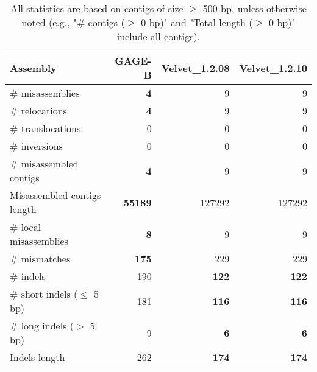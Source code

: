 \documentclass[12pt,a4paper]{article}
\begin{document}
\begin{table}[ht]
\begin{center}
\caption{All statistics are based on contigs of size $\geq$ 500 bp, unless otherwise noted (e.g., "\# contigs ($\geq$ 0 bp)" and "Total length ($\geq$ 0 bp)" include all contigs).}
\begin{tabular}{|l*{3}{|r}|}
\hline
Assembly & GAGE-B & Velvet\_1.2.08 & Velvet\_1.2.10 \\ \hline
\# misassemblies & {\bf 4} & 9 & 9 \\ \hline
\hspace{5mm}\# relocations & {\bf 4} & 9 & 9 \\ \hline
\hspace{5mm}\# translocations & 0 & 0 & 0 \\ \hline
\hspace{5mm}\# inversions & 0 & 0 & 0 \\ \hline
\# misassembled contigs & {\bf 4} & 9 & 9 \\ \hline
Misassembled contigs length & {\bf 55189} & 127292 & 127292 \\ \hline
\# local misassemblies & {\bf 8} & 9 & 9 \\ \hline
\# mismatches & {\bf 175} & 229 & 229 \\ \hline
\# indels & 190 & {\bf 122} & {\bf 122} \\ \hline
\hspace{5mm}\# short indels ($\leq$ 5 bp) & 181 & {\bf 116} & {\bf 116} \\ \hline
\hspace{5mm}\# long indels ($>$ 5 bp) & 9 & {\bf 6} & {\bf 6} \\ \hline
Indels length & 262 & {\bf 174} & {\bf 174} \\ \hline
\end{tabular}
\end{center}
\end{table}
\end{document}
